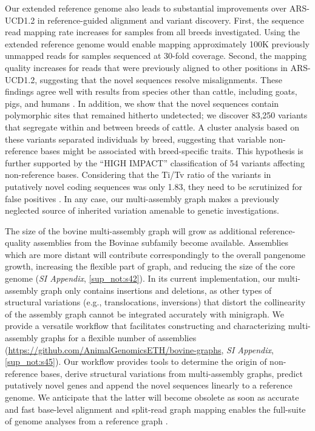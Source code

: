 \documentclass[../main.tex]{subfiles}
\begin{document}
Our extended reference genome also leads to substantial improvements over ARS-UCD1.2 in reference-guided alignment and variant discovery. First, the sequence read mapping rate increases for samples from all breeds investigated. Using the extended reference genome would enable mapping approximately 100K previously unmapped reads for samples sequenced at 30-fold coverage. Second, the mapping quality increases for reads that were previously aligned to other positions in ARS-UCD1.2, suggesting that the novel sequences resolve misalignments. These findings agree well with results from species other than cattle, including goats, pigs, and humans \citep{tian2019building,li2019towards,audano2019characterizing}. In addition, we show that the novel sequences contain polymorphic sites that remained hitherto undetected; we discover 83,250 variants that segregate within and between breeds of cattle. A cluster analysis based on these variants separated individuals by breed, suggesting that variable non-reference bases might be associated with breed-specific traits. This hypothesis is further supported by the “HIGH IMPACT” classification of 54 variants affecting non-reference bases. Considering that the Ti/Tv ratio of the variants in putatively novel coding sequences was only 1.83, they need to be scrutinized for false positives \citep{depristo2011framework}. In any case, our multi-assembly graph makes a previously neglected source of inherited variation amenable to genetic investigations.

The size of the bovine multi-assembly graph will grow as additional reference-quality assemblies from the Bovinae subfamily become available. Assemblies which are more distant will contribute correspondingly to the overall pangenome growth, increasing the flexible part of graph, and reducing the size of the core genome (\emph{SI Appendix}, \ref{sup_not:s42}). In its current implementation, our multi-assembly graph only contains insertions and deletions, as other types of structural variations (e.g., translocations, inversions) that distort the collinearity of the assembly graph cannot be integrated accurately with minigraph. We provide a versatile workflow that facilitates constructing and characterizing multi-assembly graphs for a flexible number of assemblies (\url{https://github.com/AnimalGenomicsETH/bovine-graphs}, \emph{SI Appendix}, \ref{sup_not:s45}). Our workflow provides tools to determine the origin of non-reference bases, derive structural variations from multi-assembly graphs, predict putatively novel genes and append the novel sequences linearly to a reference genome. We anticipate that the latter will become obsolete as soon as accurate and fast base-level alignment and split-read graph mapping enables the full-suite of genome analyses from a reference graph \citep{siren2020genotyping}.
\end{document}
